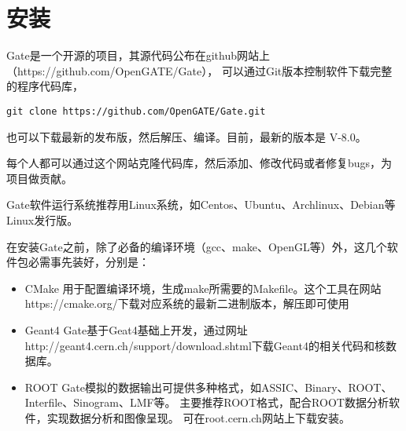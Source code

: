 
\chapter{安装}


Gate是一个开源的项目，其源代码公布在github网站上（https://github.com/OpenGATE/Gate），
可以通过Git版本控制软件下载完整的程序代码库，

\begin{lstlisting}
git clone https://github.com/OpenGATE/Gate.git
\end{lstlisting}


也可以下载最新的发布版，然后解压、编译。目前，最新的版本是 V-8.0。

每个人都可以通过这个网站克隆代码库，然后添加、修改代码或者修复bugs，为项目做贡献。

Gate软件运行系统推荐用Linux系统，如Centos、Ubuntu、Archlinux、Debian等Linux发行版。

在安装Gate之前，除了必备的编译环境（gcc、make、OpenGL等）外，这几个软件包必需事先装好，分别是：

\begin{itemize}
	\item CMake 用于配置编译环境，生成make所需要的Makefile。这个工具在网站https://cmake.org/下载对应系统的最新二进制版本，解压即可使用
	\item Geant4 Gate基于Geat4基础上开发，通过网址http://geant4.cern.ch/support/download.shtml下载Geant4的相关代码和核数据库。
	\item ROOT  Gate模拟的数据输出可提供多种格式，如ASSIC、Binary、ROOT、Interfile、Sinogram、LMF等。
			主要推荐ROOT格式，配合ROOT数据分析软件，实现数据分析和图像呈现。
	可在root.cern.ch网站上下载安装。
\end{itemize}



